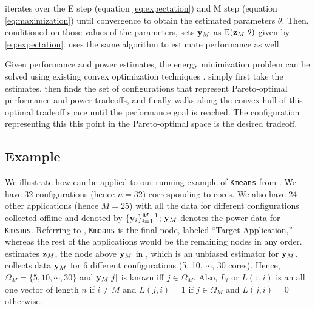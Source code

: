 
\SYSTEM{} iterates over the E step (equation \eqref{eq:expectation})
and M step (equation \eqref{eq:maximization}) until convergence to
obtain the estimated parameters $\theta$. Then, conditioned on those
values of the parameters, \SYSTEM{} sets $\mathbf{y}_M$ as $\mathbb{E}(\mathbf{z}_M | \theta)$
given by \eqref{eq:expectation}. \SYSTEM{} uses the same algorithm to
estimate performance as well.

Given performance and power estimates, the energy minimization problem
can be solved using existing convex optimization techniques
\cite{PTRADE,ControlWare,Agilos,Heartbeats2}.  \SYSTEM{} simply first
take the estimates, then finds the set of configurations that
represent Pareto-optimal performance and power tradeoffs, and finally
walks along the convex hull of this optimal tradeoff space until the
performance goal is reached.  The configuration representing this this
point in the Pareto-optimal space is the desired tradeoff.

\subsection{Example}
We illustrate how \SYSTEM{} can be applied to our running example of
\texttt{Kmeans} from . We have 32 configurations
(hence $n=32$) corresponding to cores. We also have 24 other
applications (hence $M = 25$) with all the data for different
configurations collected offline and denoted by
$\{\mathbf{y}_i\}_{i=1}^{M-1}$; $\mathbf{y}_M$ denotes the power data for
\texttt{Kmeans}. Referring to , \texttt{Kmeans} is the
final node, labeled ``Target Application,'' whereas the rest of the
applications would be the remaining nodes in any order. \SYSTEM{}
estimates $\mathbf{z}_M$, the node above $\mathbf{y}_M$ in , which is
an unbiased estimator for $\mathbf{y}_M$. \SYSTEM{} collects data $\mathbf{y}_M$ for 6
different configurations (5, 10, $\cdots$, 30 cores). Hence, $\Omega_M
= \{5, 10, \cdots, 30 \}$ and $\mathbf{y}_M[j]$ is known iff $j \in \Omega_M$.
Also, $L_i$ or $L(:,i)$ is an all one vector of length $n$ if $i \neq
M$ and $L(j,i) = 1 \text{ if } j \in \Omega_M$ and $L(j,i) = 0$
otherwise.  

